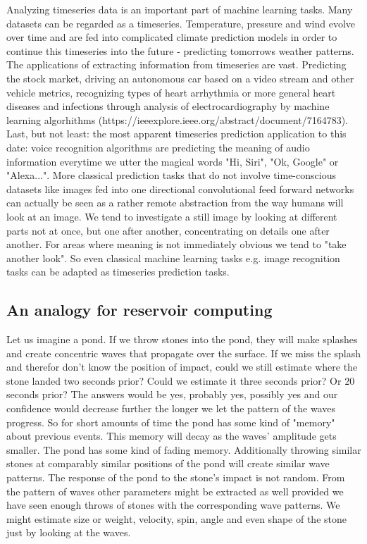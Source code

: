 Analyzing timeseries data is an important part of machine learning tasks. Many datasets can be regarded as a timeseries. Temperature, pressure and wind evolve over time and are fed into complicated climate prediction models in order to continue this timeseries into the future - predicting tomorrows weather patterns. The applications of extracting information from timeseries are vast. Predicting the stock market, driving an autonomous car based on a video stream and other vehicle metrics, recognizing types of heart arrhythmia or more general heart diseases and infections through analysis of electrocardiography by machine learning algorhithms (https://ieeexplore.ieee.org/abstract/document/7164783). Last, but not least: the most apparent timeseries prediction application to this date: voice recognition algorithms are predicting the meaning of audio information everytime we utter the magical words "Hi, Siri", "Ok, Google" or "Alexa...". 
More classical prediction tasks that do not involve time-conscious datasets like images fed into one directional convolutional feed forward networks can actually be seen as a rather remote abstraction from the way humans will look at an image. We tend to investigate a still image by looking at different parts not at once, but one after another, concentrating on details one after another. For areas where meaning is not immediately obvious we tend to "take another look". So even classical machine learning tasks e.g. image recognition tasks can be adapted as timeseries prediction tasks.  


\subsection{An analogy for reservoir computing}
	Let us imagine a pond. If we throw stones into the pond, they will make splashes and create concentric waves that propagate over the surface. If we miss the splash and therefor don't know the position of impact, could we still estimate where the stone landed two seconds prior? Could we estimate it three seconds prior? Or $20$ seconds prior? The answers would be yes, probably yes, possibly yes and our confidence would decrease further the longer we let the pattern of the waves progress. 
	So for short amounts of time the pond has some kind of "memory" about previous events. This memory will decay as the waves' amplitude gets smaller. The pond has some kind of fading memory.
	Additionally throwing similar stones at comparably similar positions of the pond will create similar wave patterns. The response of the pond to the stone's impact is not random. 
	From the pattern of waves other parameters might be extracted as well provided we have seen enough throws of stones with the corresponding wave patterns. 
	We might estimate size or weight, velocity, spin, angle and even shape of the stone just by looking at the waves. 
	
